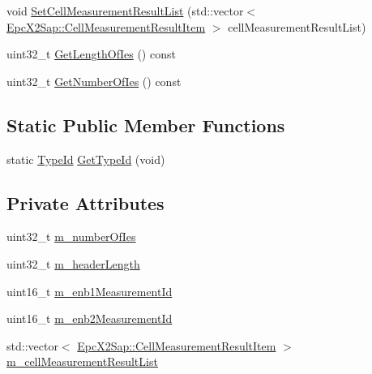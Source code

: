 \begin{DoxyCompactItemize}
\item 
void \hyperlink{classns3_1_1EpcX2ResourceStatusUpdateHeader_abd1ad857d09fc5aa06f34e1c316ead7c}{Set\+Cell\+Measurement\+Result\+List} (std\+::vector$<$ \hyperlink{structns3_1_1EpcX2Sap_1_1CellMeasurementResultItem}{Epc\+X2\+Sap\+::\+Cell\+Measurement\+Result\+Item} $>$ cell\+Measurement\+Result\+List)
\item 
uint32\+\_\+t \hyperlink{classns3_1_1EpcX2ResourceStatusUpdateHeader_a62d6e48023221d06c0a2f56d4e458803}{Get\+Length\+Of\+Ies} () const 
\item 
uint32\+\_\+t \hyperlink{classns3_1_1EpcX2ResourceStatusUpdateHeader_a901e29783a14af651e810232acf004cb}{Get\+Number\+Of\+Ies} () const 
\end{DoxyCompactItemize}
\subsection*{Static Public Member Functions}
\begin{DoxyCompactItemize}
\item 
static \hyperlink{classns3_1_1TypeId}{Type\+Id} \hyperlink{classns3_1_1EpcX2ResourceStatusUpdateHeader_a9ec195951bc72c98eeb6c95b49390ef1}{Get\+Type\+Id} (void)
\end{DoxyCompactItemize}
\subsection*{Private Attributes}
\begin{DoxyCompactItemize}
\item 
uint32\+\_\+t \hyperlink{classns3_1_1EpcX2ResourceStatusUpdateHeader_ad8852947ec96b2ba25dcfc976d287e1d}{m\+\_\+number\+Of\+Ies}
\item 
uint32\+\_\+t \hyperlink{classns3_1_1EpcX2ResourceStatusUpdateHeader_a318694daebc0b9a5f28656dc3a4ebbaa}{m\+\_\+header\+Length}
\item 
uint16\+\_\+t \hyperlink{classns3_1_1EpcX2ResourceStatusUpdateHeader_a060867e7063bf2f4870a92fb87c57a68}{m\+\_\+enb1\+Measurement\+Id}
\item 
uint16\+\_\+t \hyperlink{classns3_1_1EpcX2ResourceStatusUpdateHeader_a26cddb3363d7aa29c0c87347a09feeab}{m\+\_\+enb2\+Measurement\+Id}
\item 
std\+::vector$<$ \hyperlink{structns3_1_1EpcX2Sap_1_1CellMeasurementResultItem}{Epc\+X2\+Sap\+::\+Cell\+Measurement\+Result\+Item} $>$ \hyperlink{classns3_1_1EpcX2ResourceStatusUpdateHeader_abab9be68f01115061ce10d519fa925ab}{m\+\_\+cell\+Measurement\+Result\+List}
\end{DoxyCompactItemize}
